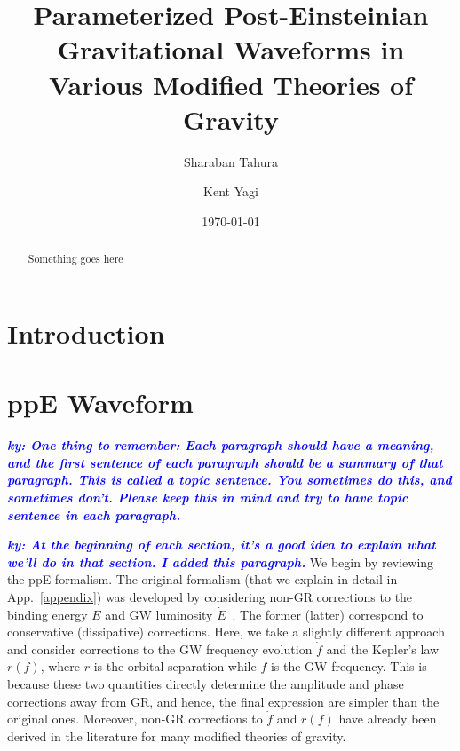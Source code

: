 \documentclass[prd,twocolumn,nofootinbib]{revtex4-1}
\newcommand{\ky}[1]{\textcolor{blue}{\it{\textbf{ky: #1}}} }
\begin{document}
\title{Parameterized Post-Einsteinian Gravitational Waveforms in \\ Various Modified Theories of Gravity}

\author{Sharaban Tahura}

\author{Kent Yagi}

\begin{abstract} 

Something goes here 

\end{abstract}

\date{\today}


\maketitle


\section{Introduction}


\section{ppE Waveform}\label{section:ppE}

\ky{One thing to remember: Each paragraph should have a meaning, and the first sentence of each paragraph should be a summary of that paragraph. This is called a topic sentence. You sometimes do this, and sometimes don't. Please keep this in mind and try to have topic sentence in each paragraph.}


\ky{At the beginning of each section, it's a good idea to explain what we'll do in that section. I added this paragraph.}
We begin by reviewing the ppE formalism. The original formalism (that we explain in detail in App.~\ref{appendix}) was developed by considering non-GR corrections to the binding energy $E$ and GW luminosity $\dot E$~\cite{Yunes:2009ke,Chatziioannou:2012rf}. The former (latter) correspond to conservative (dissipative) corrections. Here, we take a slightly different approach and consider corrections to the GW frequency evolution $\dot f$ and the Kepler's law $r(f)$, where $r$ is the orbital separation while $f$ is the GW frequency. This is because these two quantities directly determine the amplitude and phase corrections away from GR, and hence, the final expression are simpler than the original ones. Moreover, non-GR corrections to $\dot f$ and $r(f)$ have already been derived in the literature for many modified theories of gravity.
\end{document}
